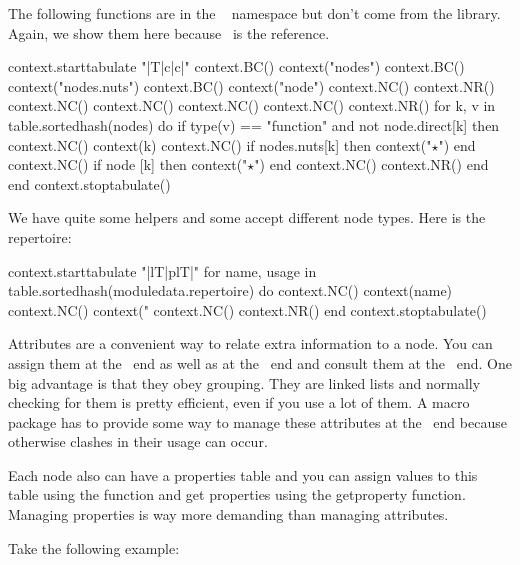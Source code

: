 The following functions are in the \CONTEXT\  namespace but don't
come from the library. Again, we show them here because \CONTEXT\ is the
reference.

\startcolumns[n=2]
\startluacode
    context.starttabulate { "|T|c|c|" }
        context.BC() context("nodes")
        context.BC() context("nodes.nuts")
        context.BC() context("node")
        context.NC() context.NR()
        context.NC()
        context.NC()
        context.NC()
        context.NC() context.NR()
        for k, v in table.sortedhash(nodes) do
            if type(v) == "function" and not node.direct[k] then
                context.NC() context(k)
                context.NC() if nodes.nuts[k] then context("$⋆$") end
                context.NC() if node      [k] then context("$⋆$") end
                context.NC() context.NR()
            end
        end
    context.stoptabulate()
\stopluacode
\stopcolumns

We have quite some helpers and some accept different node types. Here is the
repertoire:

\startluacode
    context.starttabulate { "|lT|plT|" }
    for name, usage in table.sortedhash(moduledata.repertoire) do
        context.NC() context(name)
        context.NC() context("%
        context.NC() context.NR()
    end
    context.stoptabulate()
\stopluacode

\stopsubsection

\startsubsection[title={Properties}]

Attributes are a convenient way to relate extra information to a node. You can
assign them at the \TEX\ end as well as at the \LUA\ end and consult them at the
\LUA\ end. One big advantage is that they obey grouping. They are linked lists
and normally checking for them is pretty efficient, even if you use a lot of
them. A macro package has to provide some way to manage these attributes at the
\TEX\ end because otherwise clashes in their usage can occur.

Each node also can have a properties table and you can assign values to this
table using the  function and get properties using the \type
{getproperty} function. Managing properties is way more demanding than managing
attributes.

Take the following example:

\starttyping
{}
\stoptyping

